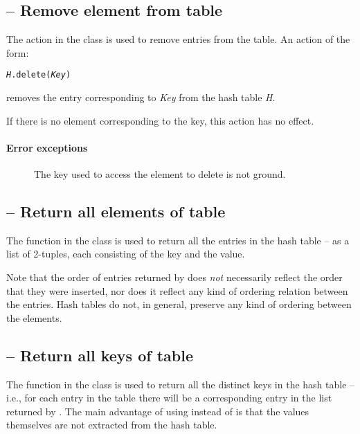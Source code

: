 \subsection{ -- Remove element from table}
\label{hash:delete}
The  action in the  class is used to remove entries from the table. An action of the form:
\begin{alltt}
\emph{H}.delete(\emph{Key})
\end{alltt}
removes the entry corresponding to \emph{Key} from the hash table \emph{H}.

If there is no element corresponding to the key, this action has no effect.

\paragraph{Error exceptions}
\begin{description}
\item[]
The key used to access the element to delete is not ground.
\end{description}

\subsection{ -- Return all elements of table}
\label{hash:ext}

The  function in the  class is used to return all the entries in the hash table -- as a list of 2-tuples, each consisting of the key and the value.

Note that the order of entries returned by  does \emph{not} necessarily reflect the order that they were inserted, nor does it reflect any kind of ordering relation between the entries. Hash tables do not, in general, preserve any kind of ordering between the elements.

\subsection{ -- Return all keys of table}
\label{hash:keys}

The  function in the  class is used to return all the distinct keys in the hash table -- i.e., for each entry in the table there will be a corresponding entry in the list returned by . The main advantage of using  instead of  is that the values themselves are not extracted from the hash table.


